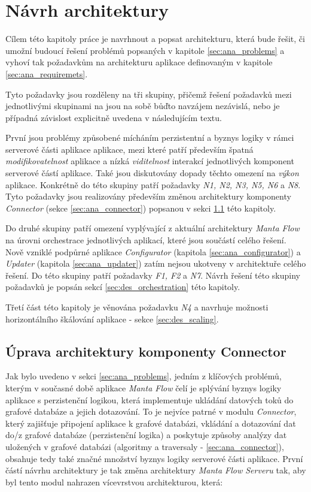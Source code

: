 \chapter{Návrh architektury}
Cílem této kapitoly práce je navrhnout a popsat architekturu, která bude řešit, či umožní budoucí řešení problémů popsaných v kapitole \ref{sec:ana_problems} a vyhoví tak požadavkům na architekturu aplikace definovaným v kapitole \ref{sec:ana_requiremets}.

Tyto požadavky jsou rozděleny na tři skupiny, přičemž řešení požadavků mezi jednotlivými skupinami na jsou na sobě bůďto navzájem nezávislá, nebo je případná závislost explicitně uvedena v následujícím textu.

První jsou problémy způsobené mícháním perzistentní a byznys logiky v rámci serverové části aplikace aplikace, mezi které patří především špatná \textit{modifikovatelnost} aplikace a nízká \textit{viditelnost} interakcí jednotlivých komponent serverové částí aplikace. Také jsou diskutovány dopady těchto omezení na \textit{výkon} aplikace. Konkrétně do této skupiny patří požadavky \textit{N1, N2, N3, N5, N6} a \textit{N8}. Tyto požadavky jsou realizovány především změnou architektury komponenty \textit{Connector} (sekce \ref{sec:ana_connector}) popsanou v sekci \ref{sec:des_api} této kapitoly.

Do druhé skupiny patří omezení vyplývající z aktuální architektury \textit{Manta Flow} na úrovni orchestrace jednotlivých aplikací, které jsou součástí celého řešení. Nově vzniklé podpůrné aplikace \textit{Configurator} (kapitola \ref{sec:ana_configurator}) a \textit{Updater} (kapitola \ref{sec:ana_updater}) zatím nejsou ukotveny v architektuře celého řešení.
Do této skupiny patří požadavky \textit{F1, F2} a \textit{N7}. Návrh řešení této skupiny požadavků je popsán sekcí \ref{sec:des_orchestration} této kapitoly.

Třetí část této kapitoly je věnována požadavku \textit{N4} a navrhuje možnosti horizontálního škálování aplikace - sekce \ref{sec:des_scaling}.

\section{Úprava architektury komponenty Connector}
\label{sec:des_api}
Jak bylo uvedeno v sekci \ref{sec:ana_problems}, jedním z klíčových problémů, kterým v současné době aplikace \textit{Manta Flow} čelí je splývání byznys logiky aplikace s perzistenční logikou, která implementuje ukládání datových toků do grafové databáze a jejich dotazování. To je nejvíce patrné v modulu \textit{Connector}, který zajišťuje připojení aplikace k grafové databázi, vkládání a dotazování dat do/z grafové databáze (perzistenční logika) a poskytuje způsoby analýzy dat uložených v grafové databázi (algoritmy a traversaly - \ref{sec:ana_connector}), obsahuje tedy také značné množství byznys logiky serverové části aplikace. První částí návrhu architektury je tak změna architektury \textit{Manta Flow Serveru} tak, aby byl tento modul nahrazen vícevrstvou architekturou, která:

